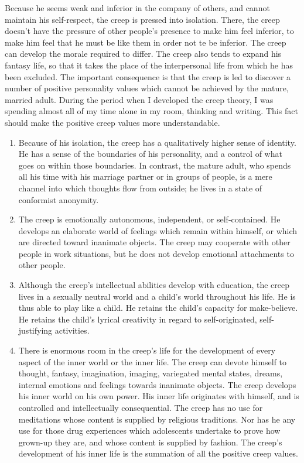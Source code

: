 \documentclass[10pt,twoside,draft]{memoir}
\begin{document}
{{{Because he seems weak and inferior in the company of others, and 
cannot maintain his self-respect, the creep is pressed into isolation. There, 
the creep doesn't have the pressure of other people's presence to make him 
feel inferior, to make him feel that he must be like them in order not te be 
inferior. The creep can develop the morale required to differ. The creep also 
tends to expand his fantasy life, so that it takes the place of the 
interpersonal life from which he has been excluded. The important 
consequence is that the creep is led to discover a number of positive 
personality values which cannot be achieved by the mature, married adult. 
During the period when I developed the creep theory, I was spending almost 
all of my time alone in my room, thinking and writing. This fact should 
make the positive creep values more understandable. 

\begin{enumerate}
\item Because of his isolation, the creep has a qualitatively higher sense of 
identity. He has a sense of the boundaries of his personality, and a control of 
what goes on within those boundaries. In contrast, the mature adult, who 
spends all his time with his marriage partner or in groups of people, is a mere 
channel into which thoughts flow from outside; he lives in a state of 
conformist anonymity. 

\item The creep is emotionally autonomous, independent, or 
self-contained. He develops an elaborate world of feelings which remain 
within himself, or which are directed toward inanimate objects. The creep 
may cooperate with other people in work situations, but he does not develop 
emotional attachments to other people. 

\item Although the creep's intellectual abilities develop with education, 
the creep lives in a sexually neutral world and a child's world throughout his 
life. He is thus able to play like a child. He retains the child's capacity for 
make-believe. He retains the child's lyrical creativity in regard to 
self-originated, self-justifying activities. 

\item There is enormous room in the creep's life for the development of 
every aspect of the inner world or the inner life. The creep can devote 
himself to thought, fantasy, imagination, imaging, variegated mental states, 
dreams, internal emotions and feelings towards inanimate objects. The creep 
develops his inner world on his own power. His inner life originates with 
himself, and is controlled and intellectually consequential. The creep has no 
use for meditations whose content is supplied by religious traditions. Nor has 
he any use for those drug experiences which adolescents undertake to prove 
how grown-up they are, and whose content is supplied by fashion. The 
creep's development of his inner life is the summation of all the positive 
creep values. 
\end{enumerate}

}}}
\end{document}
